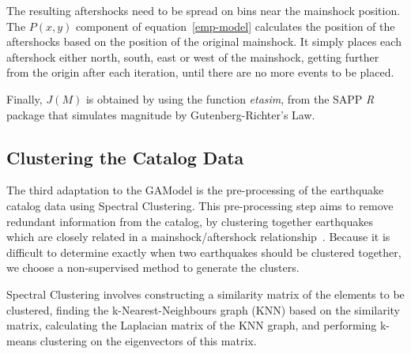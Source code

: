The resulting aftershocks need to be spread on bins near the mainshock
position. The $P(x,y)$ component of equation~\ref{emp-model}
calculates the position of the aftershocks based on the position of
the original mainshock. It simply places each aftershock either north,
south, east or west of the mainshock, getting further from the origin
after each iteration, until there are no more events to be placed.


Finally, $J(M)$ is obtained by using the function \emph{etasim}, from
the SAPP \textit{R} package that simulates magnitude by
Gutenberg-Richter’s Law.


\subsection{Clustering the Catalog Data}

The third adaptation to the GAModel is the pre-processing of the
earthquake catalog data using Spectral Clustering. This pre-processing
step aims to remove redundant information from the catalog, by
clustering together earthquakes which are closely related in a
mainshock/aftershock relationship~\cite{van2012seismicity}. Because it
is difficult to determine exactly when two earthquakes should be
clustered together, we choose a non-supervised method to generate the
clusters.

Spectral Clustering involves constructing a similarity matrix of the
elements to be clustered, finding the k-Nearest-Neighbours graph (KNN)
based on the similarity matrix, calculating the Laplacian matrix of
the KNN graph, and performing k-means clustering on the eigenvectors
of this matrix.

